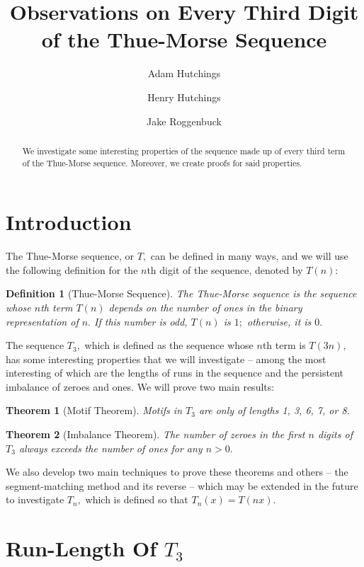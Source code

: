 \documentclass{article}
\newtheorem{theorem}{Theorem}[section]
\newtheorem{definition}{Definition}[section]
\begin{document}
\title{Observations on Every Third Digit of the Thue-Morse Sequence}
\author{
	Adam Hutchings
	\and
	Henry Hutchings
	\and
	Jake Roggenbuck
}
\maketitle

\begin{abstract}
We investigate some interesting properties of the sequence made up of every third term of the Thue-Morse sequence. Moreover, we create proofs for said properties.
\end{abstract}

\tableofcontents

\section{Introduction}
The Thue-Morse sequence, or $T,$ can be defined in many ways, and we will use the following definition for the $n$th digit of the sequence, denoted by $T(n):$ 
\begin{definition}[Thue-Morse Sequence]
The Thue-Morse sequence is the sequence whose $n$th term $T(n)$ depends on the number of ones in the binary representation of $n.$ If this number is odd, $T(n)$ is $1;$ otherwise, it is $0.$
\end{definition}
The sequence $T_3,$ which is defined as the sequence whose $n$th term is $T(3n),$ has some interesting properties that we will investigate -- among the most interesting of which are the lengths of runs in the sequence and the persistent imbalance of zeroes and ones. We will prove two main results:

\begin{theorem}[Motif Theorem]
\label{mlength}
Motifs in $T_3$ are only of lengths 1, 3, 6, 7, or 8.
\end{theorem}

\begin{theorem}[Imbalance Theorem]
\label{ratio}
The number of zeroes in the first $n$ digits of $T_3$ always exceeds the number of ones for any $n > 0.$
\end{theorem}

We also develop two main techniques to prove these theorems and others -- the segment-matching method and its reverse -- which may be extended in the future to investigate $T_n,$ which is defined so that $T_n(x) = T(nx).$

\section{Run-Length Of $T_3$}
\end{document}
